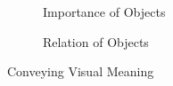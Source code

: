 \documentclass[twoside]{article}
\begin{document}
\begin{figure}[H]
        \centering
        \begin{subfigure}[b]{0.3\textwidth}
                \caption{Importance of Objects}
                \label{fig:imp_objects}
        \end{subfigure}%
        \qquad %
        \begin{subfigure}[b]{0.3\textwidth}
                \caption{Relation of Objects}
                \label{fig:rel_objects}
        \end{subfigure}
        \caption{Conveying Visual Meaning}\label{fig:Objects}
\end{figure}
\end{document}
